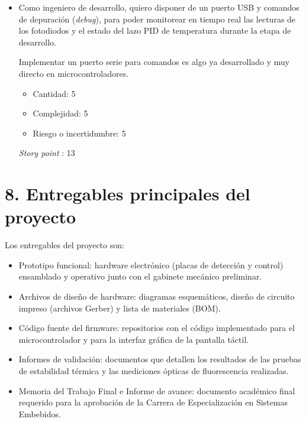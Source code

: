 \documentclass[
11pt, %
]{charter}
\begin{document}
\begin{itemize}
\begin{center}
\textit{Story point} : 34
\end{center} 
    
    \item Como ingeniero de desarrollo, quiero disponer de un puerto USB y comandos de depuración (\textit{debug}), para poder monitorear en tiempo real las lecturas de los fotodiodos y el estado del lazo PID de temperatura durante la etapa de desarrollo. 
    
    Implementar un puerto serie para comandos es algo ya desarrollado y muy directo en microcontroladores. 
    \begin{itemize}
    	\item Cantidad: 5
    	\item Complejidad: 5
    	\item Riesgo o incertidumbre: 5
	\end{itemize}

\begin{center}
\textit{Story point} : 13
\end{center}

\end{itemize}


\section{8. Entregables principales del proyecto}
\label{sec:entregables}

Los entregables del proyecto son:

\begin{itemize}
	\item Prototipo funcional: hardware electrónico (placas de detección y control) ensamblado y operativo junto con el gabinete mecánico preliminar.
	\item Archivos de diseño de hardware: diagramas esquemáticos, diseño de circuito impreso (archivos Gerber) y lista de materiales (BOM).
	\item Código fuente del firmware: repositorios con el código implementado para el microcontrolador y para la interfaz gráfica de la pantalla táctil.
	\item Informes de validación: documentos que detallen los resultados de las pruebas de estabilidad térmica y las mediciones ópticas de fluorescencia realizadas.
	\item Memoria del Trabajo Final e Informe de avance: documento académico final requerido para la aprobación de la Carrera de Especialización en Sistemas Embebidos.
\end{itemize}
\end{document}
